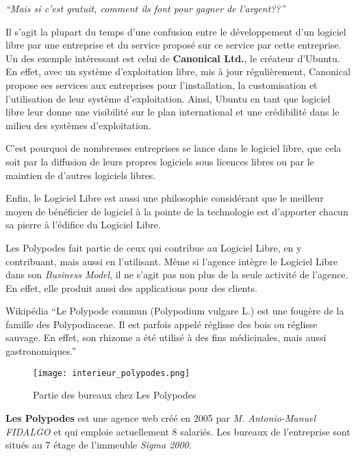\textit{``Mais si c'est gratuit, comment ils font pour gagner de l'argent??''}

Il s'agit la plupart du temps d'une confusion entre le développement d'un logiciel libre par une entreprise et du service proposé sur ce service par cette entreprise. Un des exemple intéressant est celui de \textbf{Canonical Ltd.}, le créateur d'Ubuntu. En effet, avec un système d'exploitation libre, mis à jour régulièrement, Canonical propose ses services aux entreprises pour l'installation, la customisation et l'utilisation de leur système d'exploitation. Ainsi, Ubuntu en tant que logiciel libre leur donne une visibilité sur le plan international et une crédibilité dans le milieu des systèmes d'exploitation.

C'est pourquoi de nombreuses entreprises se lance dans le logiciel libre, que cela soit par la diffusion de leurs propres logiciels sous licences libres ou par le maintien de d'autres logiciels libres.

Enfin, le Logiciel Libre est aussi une philosophie considérant que le meilleur moyen de bénéficier de logiciel à la pointe de la technologie est d'apporter chacun sa pierre à l'édifice du Logiciel Libre.

Les Polypodes fait partie de ceux qui contribue au Logiciel Libre, en y contribuant, mais aussi en l'utilisant. Même si l'agence intègre le Logiciel Libre dans son \textit{Business Model}, il ne s'agit pas non plus de la seule activité de l'agence. En effet, elle produit aussi des applications pour des clients.

\vspace{1cm}

\begin{aquote}{Wikipédia}
``Le Polypode commun (Polypodium vulgare L.) est une fougère de la famille des Polypodiaceae. Il est parfois appelé réglisse des bois ou réglisse sauvage. En effet, son rhizome a été utilisé à des fins médicinales, mais aussi gastronomiques.''
\end{aquote}

\begin{figure}[h]
\texttt{[image: interieur\_polypodes.png]}
\caption{Partie des bureaux chez Les Polypodes}
\end{figure}

\textbf{Les Polypodes} est une agence web créé en 2005 par \textit{M. Antonio-Manuel FIDALGO} et qui emploie actuellement 8 salariés. Les bureaux de l'entreprise sont situés au 7 étage de l'immeuble \textit{Sigma 2000}.

